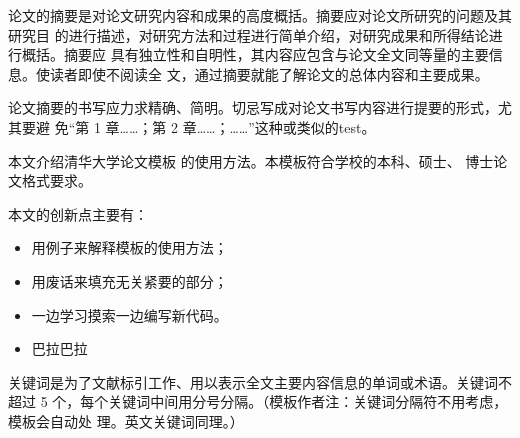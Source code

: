 \begin{cabstract}
  论文的摘要是对论文研究内容和成果的高度概括。摘要应对论文所研究的问题及其研究目
  的进行描述，对研究方法和过程进行简单介绍，对研究成果和所得结论进行概括。摘要应
  具有独立性和自明性，其内容应包含与论文全文同等量的主要信息。使读者即使不阅读全
  文，通过摘要就能了解论文的总体内容和主要成果。

  论文摘要的书写应力求精确、简明。切忌写成对论文书写内容进行提要的形式，尤其要避
  免“第 1 章……；第 2 章……；……”这种或类似的test。

  本文介绍清华大学论文模板 \thuthesis{} 的使用方法。本模板符合学校的本科、硕士、
  博士论文格式要求。

  本文的创新点主要有：
  \begin{itemize}
    \item 用例子来解释模板的使用方法；
    \item 用废话来填充无关紧要的部分；
    \item 一边学习摸索一边编写新代码。
    \item 巴拉巴拉
  \end{itemize}

  关键词是为了文献标引工作、用以表示全文主要内容信息的单词或术语。关键词不超过 5
  个，每个关键词中间用分号分隔。（模板作者注：关键词分隔符不用考虑，模板会自动处
  理。英文关键词同理。）
\end{cabstract}





